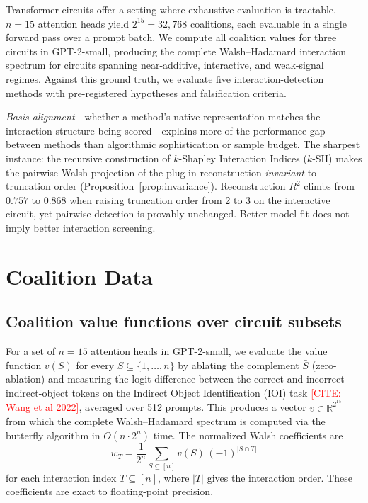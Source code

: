 \documentclass[11pt]{article}
\newcommand{\citeneeded}[1]{\textcolor{red}{[CITE: #1]}}
\begin{document}
Transformer circuits offer a setting where exhaustive evaluation is
tractable. $n = 15$ attention heads yield $2^{15} = 32{,}768$
coalitions, each evaluable in a single forward pass over a prompt
batch. We compute all coalition values for three circuits in
GPT-2-small, producing the complete Walsh--Hadamard interaction
spectrum for circuits spanning near-additive, interactive, and
weak-signal regimes. Against this ground truth, we evaluate five
interaction-detection methods with pre-registered hypotheses and
falsification criteria.

\emph{Basis alignment}---whether a method's native representation
matches the interaction structure being scored---explains more of
the performance gap between methods than algorithmic sophistication
or sample budget.
The sharpest instance: the recursive construction of $k$-Shapley
Interaction Indices ($k$-SII) \citep{bordt2023shapley} makes the
pairwise Walsh projection of the plug-in reconstruction
\emph{invariant} to truncation order
(Proposition~\ref{prop:invariance}).
Reconstruction $R^2$ climbs from $0.757$ to $0.868$ when raising
truncation order from 2 to 3 on the interactive circuit, yet
pairwise detection is provably unchanged.
Better model fit does not imply better interaction screening.


\section{Coalition Data}
\label{sec:ground-truth}

\subsection{Coalition value functions over circuit subsets}

For a set of $n = 15$ attention heads in GPT-2-small, we evaluate
the value function $v(S)$ for every $S \subseteq \{1, \ldots, n\}$
by ablating the complement $\bar{S}$ (zero-ablation) and measuring
the logit difference between the correct and incorrect indirect-object
tokens on the Indirect Object Identification (IOI) task
\citeneeded{Wang et al 2022}, averaged over 512 prompts. This
produces a vector $v \in \mathbb{R}^{2^{15}}$ from which the
complete Walsh--Hadamard spectrum is computed via the butterfly
algorithm in $O(n \cdot 2^n)$ time. The normalized Walsh coefficients
are
\[
  w_T = \frac{1}{2^n} \sum_{S \subseteq [n]} v(S) \,(-1)^{|S \cap T|}
\]
for each interaction index $T \subseteq [n]$, where $|T|$ gives the
interaction order. These coefficients are exact to floating-point
precision.
\end{document}
